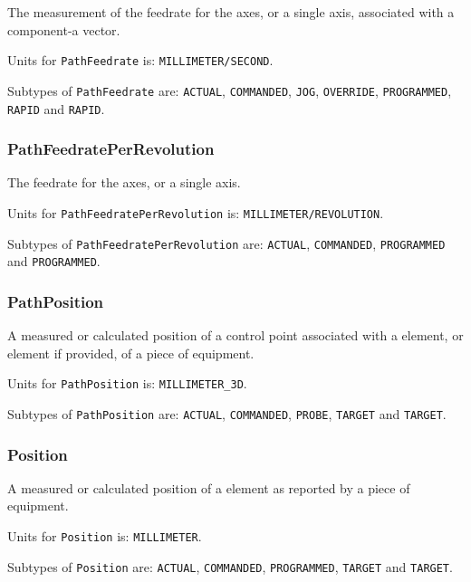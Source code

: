 The measurement of the feedrate for the axes, or a single axis, associated with a  component-a vector.


Units for \texttt{PathFeedrate} is: \texttt{MILLIMETER/SECOND}.


Subtypes of \texttt{PathFeedrate} are: \texttt{ACTUAL}, \texttt{COMMANDED}, \texttt{JOG}, \texttt{OVERRIDE}, \texttt{PROGRAMMED}, \texttt{RAPID} and \texttt{RAPID}. 
\FloatBarrier

\subsubsection{PathFeedratePerRevolution}
  \label{sec:PathFeedratePerRevolution}



The feedrate for the axes, or a single axis.


Units for \texttt{PathFeedratePerRevolution} is: \texttt{MILLIMETER/REVOLUTION}.


Subtypes of \texttt{PathFeedratePerRevolution} are: \texttt{ACTUAL}, \texttt{COMMANDED}, \texttt{PROGRAMMED} and \texttt{PROGRAMMED}. 
\FloatBarrier

\subsubsection{PathPosition}
  \label{sec:PathPosition}



A measured or calculated position of a control point associated with a  element, or  element if provided, of a piece of equipment.


Units for \texttt{PathPosition} is: \texttt{MILLIMETER_3D}.


Subtypes of \texttt{PathPosition} are: \texttt{ACTUAL}, \texttt{COMMANDED}, \texttt{PROBE}, \texttt{TARGET} and \texttt{TARGET}. 
\FloatBarrier

\subsubsection{Position}
  \label{sec:Position}



A measured or calculated position of a  element as reported by a piece of equipment.


Units for \texttt{Position} is: \texttt{MILLIMETER}.


Subtypes of \texttt{Position} are: \texttt{ACTUAL}, \texttt{COMMANDED}, \texttt{PROGRAMMED}, \texttt{TARGET} and \texttt{TARGET}. 
\FloatBarrier

